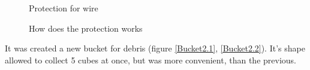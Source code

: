 \begin{figure}[H]
	\begin{minipage}[h]{0.47\linewidth}
		\caption{Protection for wire}
		\label{Shiftbuc2.13}
	\end{minipage}
	\hfill
	\begin{minipage}[h]{0.47\linewidth}
		\caption{How does the protection works}
		\label{Shiftbuc2.14}
	\end{minipage}
\end{figure}

It was created a new bucket for debris (figure \ref{Bucket2.1}, \ref{Bucket2.2}). It's shape allowed to collect 5 cubes at once, but was more convenient, than the previous.

